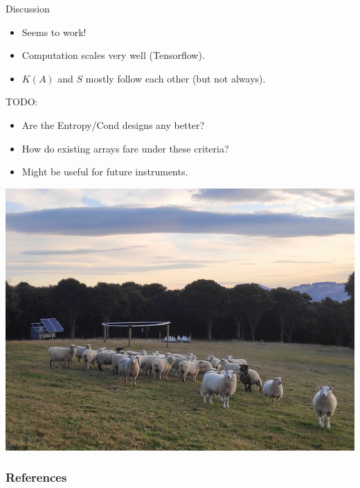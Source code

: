 \documentclass[ignorenonframetext]{beamer}
\begin{document}
\begin{frame}{Discussion}

\begin{itemize}
 \item Seems to work!
 \item Computation scales very well (Tensorflow).
 \item $K(A)$ and $S$ mostly follow each other (but not always).
\end{itemize}

TODO:
\begin{itemize}
\item Are the Entropy/Cond designs any better?
\item How do existing arrays fare under these criteria?
\item Might be useful for future instruments. 
\end{itemize}
\end{frame}

\begin{frame}
\includegraphics[width=\linewidth]{../tart_calibration/fig/radio_agronomy.jpg}
\end{frame}


\begin{frame}[allowframebreaks]
    \frametitle{References}
    
    
\end{frame}
\end{document}
